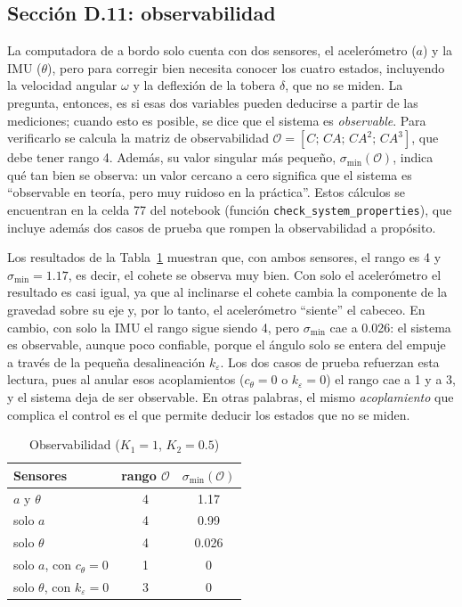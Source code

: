 \documentclass[article, 11pt]{IEEEtran}   %
\begin{document}
\subsection{Secci\'on D.11: observabilidad}

La computadora de a bordo solo cuenta con dos sensores, el acelerómetro ($a$) y la IMU ($\theta$), pero para corregir bien necesita conocer los cuatro estados, incluyendo la velocidad angular $\omega$ y la deflexión de la tobera $\delta$, que no se miden. La pregunta, entonces, es si esas dos variables pueden deducirse a partir de las mediciones; cuando esto es posible, se dice que el sistema es \emph{observable}. Para verificarlo se calcula la matriz de observabilidad $\mathcal{O}=[C;\,CA;\,CA^2;\,CA^3]$, que debe tener rango 4. Además, su valor singular más pequeño, $\sigma_{\min}(\mathcal{O})$, indica qué tan bien se observa: un valor cercano a cero significa que el sistema es ``observable en teoría, pero muy ruidoso en la práctica''. Estos cálculos se encuentran en la celda 77 del notebook (función \texttt{check\_system\_properties}), que incluye además dos casos de prueba que rompen la observabilidad a propósito.

Los resultados de la Tabla~\ref{tab:obs} muestran que, con ambos sensores, el rango es 4 y $\sigma_{\min}=1.17$, es decir, el cohete se observa muy bien. Con solo el acelerómetro el resultado es casi igual, ya que al inclinarse el cohete cambia la componente de la gravedad sobre su eje y, por lo tanto, el acelerómetro ``siente'' el cabeceo. En cambio, con solo la IMU el rango sigue siendo 4, pero $\sigma_{\min}$ cae a 0.026: el sistema es observable, aunque poco confiable, porque el ángulo solo se entera del empuje a través de la pequeña desalineación $k_\varepsilon$. Los dos casos de prueba refuerzan esta lectura, pues al anular esos acoplamientos ($c_\theta=0$ o $k_\varepsilon=0$) el rango cae a 1 y a 3, y el sistema deja de ser observable. En otras palabras, el mismo \emph{acoplamiento} que complica el control es el que permite deducir los estados que no se miden.

\begin{table}[H]
\centering
\caption{Observabilidad ($K_1=1$, $K_2=0.5$)}
\label{tab:obs}
\begin{tabular}{|l|c|c|}
\hline
Sensores & rango $\mathcal{O}$ & $\sigma_{\min}(\mathcal{O})$\\
\hline
$a$ y $\theta$ & 4 & 1.17\\
solo $a$ & 4 & 0.99\\
solo $\theta$ & 4 & 0.026\\
solo $a$, con $c_\theta=0$ & 1 & 0\\
solo $\theta$, con $k_\varepsilon=0$ & 3 & 0\\
\hline
\end{tabular}
\end{table}
\end{document}
